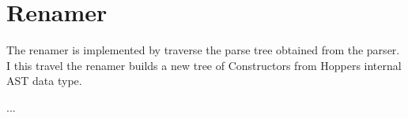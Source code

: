 \section{Renamer}
The renamer is implemented by traverse the parse tree obtained from the parser.
I this travel the renamer builds a new tree of Constructors from Hoppers 
internal AST data type.

...


